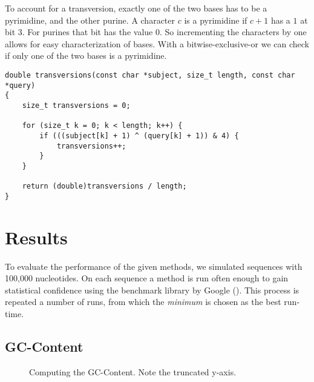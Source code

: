 \documentclass[10pt,letterpaper]{article}
\begin{document}
To account for a transversion, exactly one of the two bases has to be a pyrimidine, and the other purine. A character $c$ is a pyrimidine if $c + 1$ has a $1$ at bit 3. For purines that bit has the value $0$. So incrementing the characters by one allows for easy characterization of bases. With a bitwise-exclusive-or we can check if only one of the two bases is a pyrimidine.

\begin{lstlisting}
double transversions(const char *subject, size_t length, const char *query)
{
    size_t transversions = 0;

    for (size_t k = 0; k < length; k++) {
        if (((subject[k] + 1) ^ (query[k] + 1)) & 4) {
            transversions++;
        }
    }

    return (double)transversions / length;
}
\end{lstlisting}


\section*{Results}

To evaluate the performance of the given methods, we simulated sequences with 100{,}000 nucleotides. On each sequence a method is run often enough to gain statistical confidence using the benchmark library by Google (). This process is repeated a number of runs, from which the \emph{minimum} is chosen as the best run-time.

\subsection*{GC-Content}


\begin{figure}
    \caption{Computing the GC-Content. Note the truncated y-axis.}
\end{figure}
\end{document}
